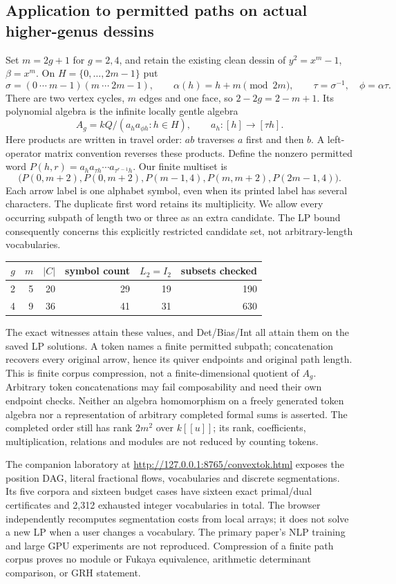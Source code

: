 \documentclass[11pt,oneside,openany]{book}
\theoremstyle{definition}\newtheorem{definition}[theorem]{Definition}
\theoremstyle{remark}\newtheorem{remark}[theorem]{Remark}
\begin{document}
\subsection{Application to permitted paths on actual higher-genus dessins}
Set $m=2g+1$ for $g=2,4$, and retain the existing clean dessin of
$y^2=x^m-1$, $\beta=x^m$. On $H=\{0,\ldots,2m-1\}$ put
\[
 \sigma=(0\ \cdots\ m-1)(m\ \cdots\ 2m-1),\qquad
 \alpha(h)=h+m\pmod{2m},\qquad \tau=\sigma^{-1},\quad\phi=\alpha\tau.
\]
There are two vertex cycles, $m$ edges and one face, so
$2-2g=2-m+1$. Its polynomial algebra is the infinite locally gentle
algebra
\[
 A_g=kQ/(a_h a_{\phi h}:h\in H),\qquad
 a_h:[h]\longrightarrow[\tau h].
\]
Here products are written in travel order: $ab$ traverses $a$ first and
then $b$. A left-operator matrix convention reverses these products.
Define the nonzero permitted word
$P(h,r)=a_h a_{\tau h}\cdots a_{\tau^{r-1}h}$. Our finite multiset is
\[
 \big(P(0,m+2),P(0,m+2),P(m-1,4),
      P(m,m+2),P(2m-1,4)\big).
\]
Each arrow label is one alphabet symbol, even when its printed label has
several characters. The duplicate first word retains its multiplicity.
We allow every occurring subpath of length two or three as an extra
candidate. The LP bound consequently concerns this explicitly restricted
candidate set, not arbitrary-length vocabularies.
\begin{center}\small
\begin{tabular}{rrrrrr}
\toprule
$g$ & $m$ & $|C|$ & symbol count & $L_2=I_2$ & subsets checked\\
\midrule
2&5&20&29&19&190\\
4&9&36&41&31&630\\
\bottomrule
\end{tabular}
\end{center}
The exact witnesses attain these values, and Det/Bias/Int all attain
them on the saved LP solutions. A token names a finite permitted subpath;
concatenation recovers every original arrow, hence its quiver endpoints
and original path length. This is finite corpus compression, not a
finite-dimensional quotient of $A_g$. Arbitrary token concatenations may
fail composability and need their own endpoint checks. Neither an algebra
homomorphism on a freely generated token algebra nor a representation of
arbitrary completed formal sums is asserted. The completed order still
has rank $2m^2$ over $k[[u]]$; its rank, coefficients, multiplication,
relations and modules are not reduced by counting tokens.

The companion laboratory at
\url{http://127.0.0.1:8765/convextok.html} exposes the position DAG,
literal fractional flows, vocabularies and discrete segmentations.
Its five corpora and sixteen budget cases have sixteen exact
primal/dual certificates and 2,312 exhausted integer vocabularies in
total. The browser independently recomputes segmentation costs from
local arrays; it does not solve a new LP when a user changes a vocabulary.
The primary paper's NLP training and large GPU experiments are not
reproduced. Compression of a finite path corpus proves no module or
Fukaya equivalence, arithmetic determinant comparison, or GRH statement.
\end{document}
